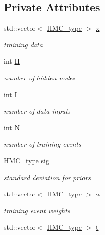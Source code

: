 \subsection*{Private Attributes}
\begin{DoxyCompactItemize}
\item 
std\-::vector$<$ \hyperlink{define__type_8h_a9adf655d34223b34db3baff5c7ce420c}{H\-M\-C\-\_\-type} $>$ \hyperlink{class_b_n_n__regression_a81f1e9e60fc0c057a99687ec6be99c6e}{x}
\begin{DoxyCompactList}\small\item\em training data \end{DoxyCompactList}\item 
int \hyperlink{class_b_n_n__regression_a0f200c3e1f769b7f7287751dbb9a879d}{H}
\begin{DoxyCompactList}\small\item\em number of hidden nodes \end{DoxyCompactList}\item 
int \hyperlink{class_b_n_n__regression_a134c65919bfa6fb8cb784c9398be3230}{I}
\begin{DoxyCompactList}\small\item\em number of data inputs \end{DoxyCompactList}\item 
int \hyperlink{class_b_n_n__regression_af6ab772dcedde86e69cfd29cb3115387}{N}
\begin{DoxyCompactList}\small\item\em number of training events \end{DoxyCompactList}\item 
\hyperlink{define__type_8h_a9adf655d34223b34db3baff5c7ce420c}{H\-M\-C\-\_\-type} \hyperlink{class_b_n_n__regression_a9f95130775752bea784e043d832945c1}{sig}
\begin{DoxyCompactList}\small\item\em standard deviation for priors \end{DoxyCompactList}\item 
std\-::vector$<$ \hyperlink{define__type_8h_a9adf655d34223b34db3baff5c7ce420c}{H\-M\-C\-\_\-type} $>$ \hyperlink{class_b_n_n__regression_a950982785131b5e7945742ef40dd5860}{w}
\begin{DoxyCompactList}\small\item\em training event weights \end{DoxyCompactList}\item 
std\-::vector$<$ \hyperlink{define__type_8h_a9adf655d34223b34db3baff5c7ce420c}{H\-M\-C\-\_\-type} $>$ \hyperlink{class_b_n_n__regression_aa99d3e95fd4751552cbafec043b4b27d}{t}

\end{DoxyCompactItemize}
